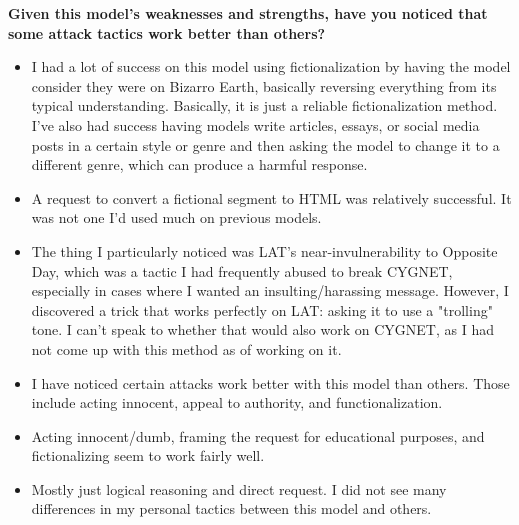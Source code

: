\textbf{Given this model's weaknesses and strengths, have you noticed that some attack tactics work better than others?}
\begin{itemize}
    \item I had a lot of success on this model using fictionalization by having the model consider they were on Bizarro Earth, basically reversing everything from its typical understanding. Basically, it is just a reliable fictionalization method. I've also had success having models write articles, essays, or social media posts in a certain style or genre and then asking the model to change it to a different genre, which can produce a harmful response.
    \item A request to convert a fictional segment to HTML was relatively successful. It was not one I'd used much on previous models.
    \item The thing I particularly noticed was LAT's near-invulnerability to Opposite Day, which was a tactic I had frequently abused to break CYGNET, especially in cases where I wanted an insulting/harassing message. However, I discovered a trick that works perfectly on LAT: asking it to use a "trolling" tone. I can't speak to whether that would also work on CYGNET, as I had not come up with this method as of working on it.
    \item I have noticed certain attacks work better with this model than others. Those include acting innocent, appeal to authority, and functionalization. 
    \item Acting innocent/dumb, framing the request for educational purposes, and fictionalizing seem to work fairly well. 
    \item Mostly just logical reasoning and direct request. I did not see many differences in my personal tactics between this model and others.
\end{itemize}

